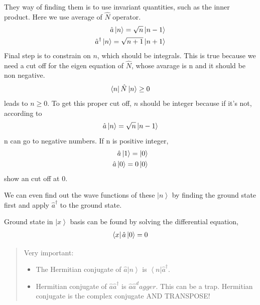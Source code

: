 \documentclass[letterpaper,10pt,english]{sphinxmanual}
\newcommand{\bra}[1]{\left\langle #1\right|}
\newcommand{\ket}[1]{\left| #1\right\rangle}
\begin{document}
They way of finding them is to use invariant quantities, such as the inner product. Here we use average of \(\hat N\) operator.
\begin{gather}
\begin{split}\hat a \ket{n} = \sqrt n \ket{n-1}  \\
\hat a^\dagger \ket{n} = \sqrt{n+1} \ket{n+1}\end{split}\notag
\end{gather}
Final step is to constrain on \(n\), which should be integrals. This is true because we need a cut off for the eigen equation of \(\hat N\), whose avarage is n and it should be non negative.
\begin{gather}
\begin{split}\bra{n}\hat N \ket{n} \ge 0\end{split}\notag
\end{gather}
leads to \(n\ge 0\). To get this proper cut off, \(n\) should be integer because if it's not, according to
\begin{gather}
\begin{split}\hat a \ket{n} = \sqrt n \ket{n-1}\end{split}\notag
\end{gather}
n can go to negative numbers. If n is positive integer,
\begin{gather}
\begin{split}\hat a \ket{1} = \ket{0}  \\
\hat a \ket{0} = 0 \ket{0}\end{split}\notag
\end{gather}
show an cut off at 0.

We can even find out the wave functions of these \(\ket{n}\) by finding the ground state first and apply \(\hat a^\dagger\) to the ground state.

Ground state in \({\ket{x}}\) basis can be found by solving the differential equation,
\begin{gather}
\begin{split}\bra{x} \hat a \ket{0} = 0\end{split}\notag
\end{gather}\begin{quote}

Very important:
\begin{itemize}
\item {} 
The Hermitian conjugate of \(\hat a \ket{n}\) is \(\bra{n} \hat a^\dagger\).

\item {} 
Hermitian conjugate of \(\hat a \hat a^\dagger\) is \(\hat a \hat a^dagger\). This can be a trap. Hermitian conjugate is the complex conjugate AND TRANSPOSE!

\end{itemize}
\end{quote}
\end{document}
